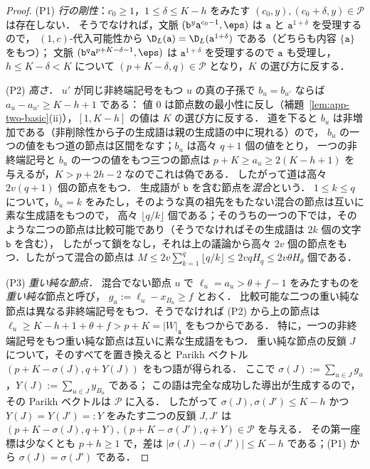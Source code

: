 \begin{proof}
(P1) \emph{行の剛性}：$c_0\ge1$，$1\le\delta\le K-h$ をみたす $(c_0,y),(c_0+\delta,y)\in\mathcal P$ は存在しない．
そうでなければ，文脈 $(\mathtt b^y\mathtt a^{c_0-1},\eps)$ は $\mathtt a$ と $\mathtt a^{1+\delta}$ を受理するので，
$(1,c)$-代入可能性から $\D_L(\mathtt a)=\D_L(\mathtt a^{1+\delta})$ である（どちらも内容 $\{\mathtt a\}$ をもつ）；
文脈 $(\mathtt b^q\mathtt a^{p+K-\delta-1},\eps)$ は $\mathtt a^{1+\delta}$ を受理するので $\mathtt a$ も受理し，
$h\le K-\delta<K$ について $(p+K-\delta,q)\in\mathcal P$ となり，$K$ の選び方に反する．

(P2) \emph{高さ．}
$u'$ が同じ非終端記号をもつ $u$ の真の子孫で $b_u=b_{u'}$ ならば $a_u-a_{u'}\ge K-h+1$ である：
値 $0$ は節点数の最小性に反し（補題~\ref{lem:app-two-basic}(ii)），$[1,K-h]$ の値は $K$ の選び方に反する．
道を下ると $b_u$ は非増加である（非削除性から子の生成語は親の生成語の中に現れる）ので，
$b_u$ の一つの値をもつ道の節点は区間をなす；$b_u$ は高々 $q+1$ 個の値をとり，
一つの非終端記号と $b_u$ の一つの値をもつ三つの節点は $p+K\ge a_u\ge2(K-h+1)$ を与えるが，$K>p+2h-2$ なのでこれは偽である．
したがって道は高々 $2v(q+1)$ 個の節点をもつ．
生成語が $\mathtt b$ を含む節点を\emph{混合}という．
$1\le k\le q$ について，$b_u=k$ をみたし，そのような真の祖先をもたない混合の節点は互いに素な生成語をもつので，
高々 $\lfloor q/k\rfloor$ 個である；そのうちの一つの下では，そのような二つの節点は比較可能であり（そうでなければその生成語は $2k$ 個の文字 $\mathtt b$ を含む），
したがって鎖をなし，それは上の議論から高々 $2v$ 個の節点をもつ．したがって混合の節点は
$M\le2v\sum_{k=1}^q\lfloor q/k\rfloor\le2vqH_q\le2v\theta H_\theta$ 個である．

(P3) \emph{重い純な節点．}
混合でない節点 $u$ で $\ell_u=a_u>\theta+f-1$ をみたすものを\emph{重い純な}節点と呼び，
$g_u:=\ell_u-x_{B_u}\ge f$ とおく．
比較可能な二つの重い純な節点は異なる非終端記号をもつ．そうでなければ (P2) から上の節点は
$\ell_u\ge K-h+1+\theta+f>p+K=|W|_{\mathtt a}$ をもつからである．
特に，一つの非終端記号をもつ重い純な節点は互いに素な生成語をもつ．
重い純な節点の反鎖 $J$ について，そのすべてを置き換えると Parikh ベクトル $(p+K-\sigma(J),q+Y(J))$ をもつ語が得られる．
ここで $\sigma(J):=\sum_{u\in J}g_u$，$Y(J):=\sum_{u\in J}y_{B_u}$ である；
この語は完全な成功した導出が生成するので，その Parikh ベクトルは $\mathcal P$ に入る．
したがって $\sigma(J),\sigma(J')\le K-h$ かつ $Y(J)=Y(J')=:Y$ をみたす二つの反鎖 $J,J'$ は
$(p+K-\sigma(J),q+Y),(p+K-\sigma(J'),q+Y)\in\mathcal P$ を与える．
その第一座標は少なくとも $p+h\ge1$ で，差は $|\sigma(J)-\sigma(J')|\le K-h$ である；(P1) から $\sigma(J)=\sigma(J')$ である．


\end{proof}
